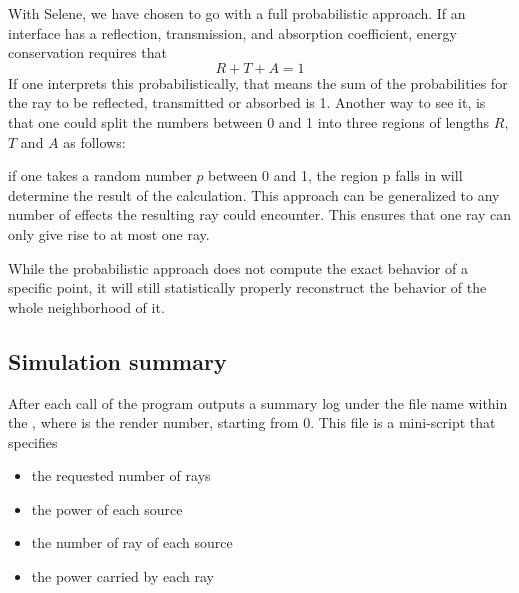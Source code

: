 With Selene, we have chosen to go with a full probabilistic approach. If an interface has a reflection, transmission, and absorption coefficient, energy conservation requires that
\begin{equation}
	R+T+A=1
\end{equation}
If one interprets this probabilistically, that means the sum of the probabilities for the ray to be reflected, transmitted or absorbed is 1. Another way to see it, is that one could split the numbers between 0 and 1 into three regions of lengths $R$, $T$ and $A$ as follows:
\begin{center}\end{center}
if one takes a random number $p$ between 0 and 1, the region p falls in will determine the result of the calculation. This approach can be generalized to any number of effects the resulting ray could encounter. This ensures that one ray can only give rise to at most one ray.

While the probabilistic approach does not compute the exact behavior of a specific point, it will still statistically properly reconstruct the behavior of the whole neighborhood of it.

\subsection{Simulation summary}

After each call of  the program outputs a summary log under the file name  within the , where  is the render number, starting from 0. This file is a mini-script that specifies
\begin{itemize}
	\item the requested number of rays
	\item the power of each source
	\item the number of ray of each source
	\item the power carried by each ray
\end{itemize}

